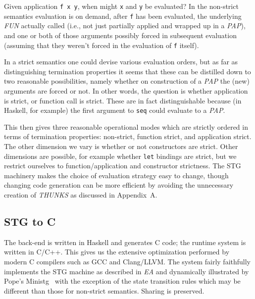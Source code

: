 \documentclass{llncs}
\begin{document}
Given application \texttt{f x y}, when might \texttt{x} and \texttt{y} be
evaluated?  In the non-strict semantics evaluation is on demand, after
\texttt{f} has been evaluated, the underlying \emph{FUN} actually called
(i.e., not just partially applied and wrapped up in a \emph{PAP}), and one or
both of those arguments possibly forced in subsequent evaluation (assuming
that they weren't forced in the evaluation of \texttt{f} itself).

In a strict semantics one could devise various evaluation orders, but as far
as distinguishing termination properties it seems that these can be distilled
down to two reasonable possibilities, namely whether on construction of a
\emph{PAP} the (new) arguments are forced or not.  In other words, the
question is whether application is strict, or function call is strict.  These
are in fact distinguishable because (in Haskell, for example) the first
argument to \texttt{seq} could evaluate to a \emph{PAP}.

This then gives three reasonable operational modes which are strictly ordered
in terms of termination properties: 
non-strict, function strict, and application strict.
The other dimension we vary is whether or not constructors are strict.  Other
dimensions are possible, for example whether \texttt{let} bindings are strict,
but we restrict ourselves to function/application and constructor strictness.
The STG machinery makes the choice of evaluation strategy easy to change,
though changing code generation can be more efficient by avoiding the
unnecessary creation of \emph{THUNKS} as discussed in Appendix~A.


\subsection{STG to C}
The back-end is written in Haskell and generates C code; the runtime system is
written in C/C++. This gives us the extensive optimization performed by modern
C compilers such as GCC and Clang/LLVM. The system fairly faithfully
implements the STG machine as described in \emph{EA} and dynamically
illustrated by Pope's Ministg~\cite{ministg} with the exception of the state
transition rules which may be different than those for non-strict semantics.
Sharing is preserved.
\end{document}
